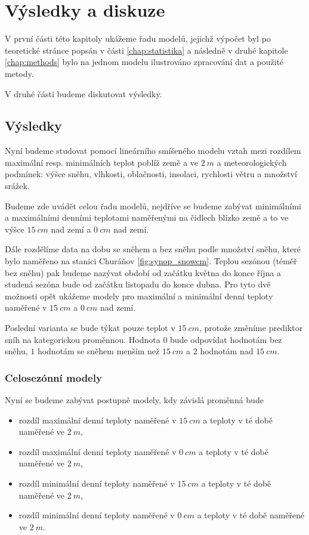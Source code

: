 \chapter{Výsledky a diskuze}\label{chap:ch3}
V první části této kapitoly ukážeme řadu modelů, jejichž výpočet byl po teoretické stránce popsán v části \ref{chap:statistika} a následně v druhé kapitole \ref{chap:methods} bylo na jednom modelu ilustrováno zpracování dat a použité metody.

V druhé části budeme diskutovat výsledky.

\section{Výsledky}

Nyní budeme studovat pomocí lineárního smíšeného modelu vztah mezi rozdílem maximální resp. minimálních teplot poblíž země a ve $\SI{2}{m}$ a meteorologických podmínek: výšce sněhu, vlhkosti, oblačnosti, insolaci, rychlosti větru a množství srážek.

Budeme zde uvádět celou řadu modelů, nejdříve se budeme zabývat minimálními a maximálními denními teplotami naměřenými na čidlech blízko země a to ve výšce $\SI{15}{cm}$ nad zemí a $\SI{0}{cm}$ nad zemí. 

Dále rozdělíme data na dobu se sněhem a bez sněhu podle množství sněhu, které bylo naměřeno na stanici Churáňov \ref{fig:synop_snowcm}. Teplou sezónou (téměř bez sněhu) pak budeme nazývat období od začátku května do konce října a studená sezóna bude od začátku listopadu do konce dubna. Pro tyto dvě možnosti opět ukážeme modely pro maximální a minimální denní teploty naměřené v $\SI{15}{cm}$ a $\SI{0}{cm}$ nad zemí.

Poslední varianta se bude týkat pouze teplot v $\SI{15}{cm}$, protože změníme prediktor sníh na kategorickou proměnnou. Hodnota $0$ bude odpovídat hodnotám bez sněhu, $1$ hodnotám se sněhem menším než $\SI{15}{cm}$ a $2$ hodnotám nad $\SI{15}{cm}$.

\subsection{Celosezónní modely}
Nyní se budeme zabývat postupně modely, kdy závislá proměnná bude

\begin{itemize}
	\item rozdíl maximální denní teploty naměřené v $\SI{15}{cm}$ a teploty v té době naměřené ve $\SI{2}{m}$,
	\item rozdíl maximální denní teploty naměřené v $\SI{0}{cm}$ a teploty v té době naměřené ve $\SI{2}{m}$,
	\item rozdíl minimální denní teploty naměřené v $\SI{15}{cm}$ a teploty v té době naměřené ve $\SI{2}{m}$,
	\item rozdíl minimální denní teploty naměřené v $\SI{0}{cm}$ a teploty v té době naměřené ve $\SI{2}{m}$.
\end{itemize}

